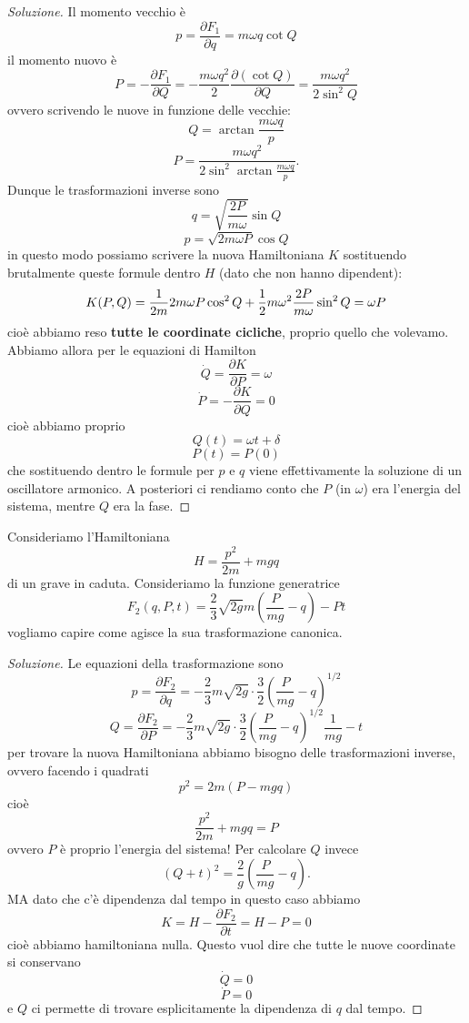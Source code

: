 \documentclass[11pt]{scrartcl}
\begin{document}
	\begin{proof}[Soluzione]
		Il momento vecchio è
		$$p=\frac{\partial F_1}{\partial q}=m\omega q\cot Q$$
		il momento nuovo è
		$$P=-\frac{\partial F_1}{\partial Q}=-\frac{m\omega q^2}{2}\frac{\partial\left(\cot Q\right)}{\partial Q}=\frac{m\omega q^2}{2\sin^2 Q}$$
		ovvero scrivendo le nuove in funzione delle vecchie:
		$$Q=\arctan \frac{m\omega q}{p}$$
		$$P=\frac{m\omega q^2}{2\sin^2 \arctan \frac{m\omega q}{p}}.$$
		Dunque le trasformazioni inverse sono
		$$q=\sqrt{\frac{2P}{m\omega}}\sin Q$$
		$$p=\sqrt{2m\omega P}\cos Q$$
		in questo modo possiamo scrivere la nuova Hamiltoniana $K$ sostituendo brutalmente queste formule dentro $H$ (dato che non hanno dipendent):
		$$K(P,Q)=\frac{1}{2m}2m\omega P \cos^2 Q+\frac{1}{2} m\omega^2\frac{2P}{m\omega}\sin^2 Q=\omega P$$
		cioè abbiamo reso \textbf{tutte le coordinate cicliche}, proprio quello che volevamo. Abbiamo allora per le equazioni di Hamilton
		$$\dot{Q}=\frac{\partial K}{\partial P}=\omega$$
		$$\dot{P}=-\frac{\partial K}{\partial Q}=0$$
		cioè abbiamo proprio
		$$Q(t)=\omega t + \delta$$
		$$P(t)=P(0)$$
		che sostituendo dentro le formule per $p$ e $q$ viene effettivamente la soluzione di un oscillatore armonico. A posteriori ci rendiamo conto che $P$ (in $\omega$) era l'energia del sistema, mentre $Q$ era la fase.
	\end{proof}
	\begin{example}
		Consideriamo l'Hamiltoniana
		$$H=\frac{p^2}{2m}+mgq$$
		di un grave in caduta. Consideriamo la funzione generatrice
		$$F_2(q,P,t)=\frac{2}{3}\sqrt{2g}m\left(\frac{P}{mg}-q\right)-Pt$$
		vogliamo capire come agisce la sua trasformazione canonica. 
	\end{example}
	\begin{proof}[Soluzione]
		Le equazioni della trasformazione sono
		$$p=\frac{\partial F_2}{\partial q}=-\frac{2}{3}m\sqrt{2g}\cdot \frac{3}{2}\left(\frac{P}{mg}-q\right)^{1/2}$$
		$$Q=\frac{\partial F_2}{\partial P}=-\frac{2}{3}m\sqrt{2g}\cdot \frac{3}{2}\left(\frac{P}{mg}-q\right)^{1/2}\frac{1}{mg}-t$$
		per trovare la nuova Hamiltoniana abbiamo bisogno delle trasformazioni inverse, ovvero facendo i quadrati
		$$p^2=2m(P-mgq)$$
		cioè
		$$\frac{p^2}{2m}+mgq=P$$
		ovvero $P$ è proprio l'energia del sistema! Per calcolare $Q$ invece
		$$(Q+t)^2=\frac{2}{g}\left(\frac{P}{mg}-q\right).$$
		MA dato che c'è dipendenza dal tempo in questo caso abbiamo
		$$K=H-\frac{\partial F_2}{\partial t}=H-P=0$$
		cioè abbiamo hamiltoniana nulla. Questo vuol dire che tutte le nuove coordinate si conservano
		$$\dot{Q}=0$$
		$$\dot{P}=0$$
		e $Q$ ci permette di trovare esplicitamente la dipendenza di $q$ dal tempo.
	\end{proof}
	
\end{document}
